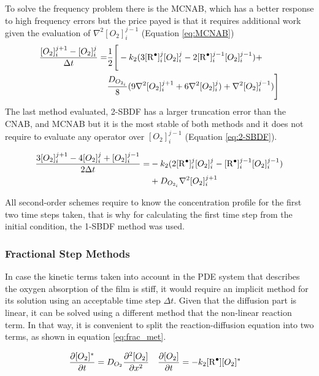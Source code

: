 \begin{refsection}
To solve the frequency problem there is the MCNAB, which has a better response to high frequency errors but the price payed is that it requires additional work given the evaluation of $\nabla^2[O_2]_i^{j-1}$ \cite{ascher1995implicit} (Equation \ref{eq:MCNAB})
\begin{align}
  \frac{[O_2]^{j+1}_i-[O_2]^j_i}{\Delta t}=& \frac{1}{2}\Biggr[-k_2(3[\ce{R^.}]_i^{j}[O_2]_i^{j}-2[\ce{R^.}]_i^{j-1}[O_2]_i^{j-1})+\nonumber\\
  &\frac{D_{O_{2_i}}}{8}(9\nabla^2[O_2]_i^{j+1}+6\nabla^2[O_2]_i^{j})+\nabla^2[O_2]_i^{j-1})\Biggr]  
  \label{eq:MCNAB}
\end{align}
The last method evaluated, 2-SBDF has a larger truncation error than the CNAB, and MCNAB but it is the most stable of both methods and it does not require to evaluate any operator over $[O_2]_i^{j-1}$ (Equation \ref{eq:2-SBDF}).

\begin{align}
    \frac{3[O_2]^{j+1}_i-4[O_2]^j_i+[O_2]^{j-1}_i}{2\Delta t}=&-k_2(2[\ce{R^.}]_i^{j}[O_2]_i^{j}-[\ce{R^.}]_i^{j-1}[O_2]_i^{j-1})\nonumber\\
    &+D_{O_{2_i}}\nabla^2[O_2]_i^{j+1} 
    \label{eq:2-SBDF}
\end{align}

All second-order schemes require to know the concentration profile for the first two time steps taken, that is why for calculating the first time step from the initial condition, the 1-SBDF method was used. 

\subsubsection{Fractional Step Methods}
In case the kinetic terms taken into account in the PDE system that describes the oxygen absorption of the film is stiff, it would require an implicit method for its solution using an acceptable time step $\Delta t$. Given that the diffusion part is linear, it can be solved using a different method that the non-linear reaction term. In that way, it is convenient to split the reaction-diffusion equation into two terms, as shown in equation \ref{eq:frac_met}.


\begin{align}
        \frac{\partial [O_2]^*}{\partial t}&=D_{O_2}\frac{\partial^2[O_2]}{\partial x^2}&
        \frac{\partial [O_2]}{\partial t} &=-k_2[\ce{R^.}][O_2]^*
    \label{eq:frac_met}
\end{align}


\end{refsection}
